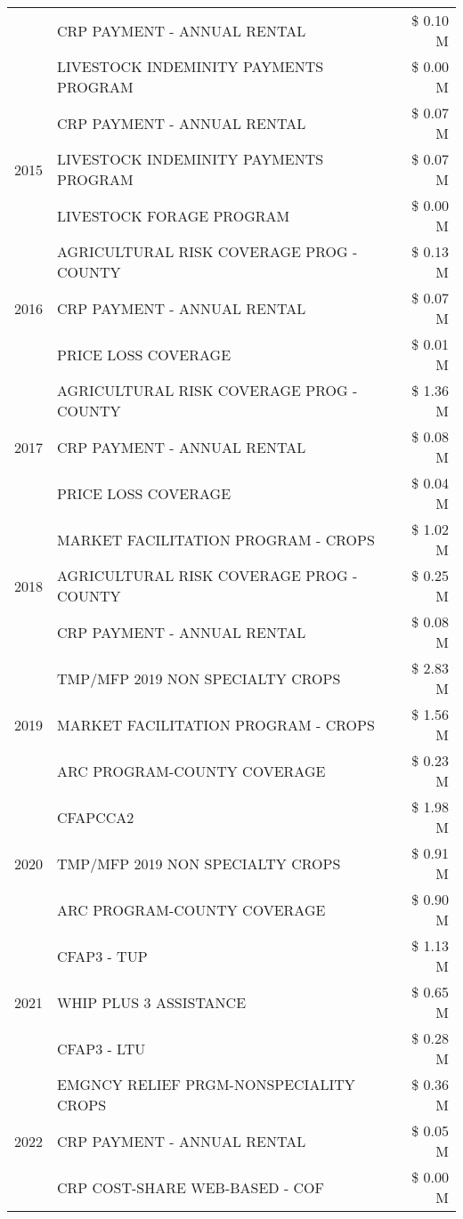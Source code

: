 \begin{tabular}{llr}
 & CRP PAYMENT - ANNUAL RENTAL & \$ 0.10 M \\
 & LIVESTOCK INDEMINITY PAYMENTS PROGRAM & \$ 0.00 M \\
\cline{1-3}
\multirow[t]{3}{*}{2015} & CRP PAYMENT - ANNUAL RENTAL & \$ 0.07 M \\
 & LIVESTOCK INDEMINITY PAYMENTS PROGRAM & \$ 0.07 M \\
 & LIVESTOCK FORAGE PROGRAM & \$ 0.00 M \\
\cline{1-3}
\multirow[t]{3}{*}{2016} & AGRICULTURAL RISK COVERAGE PROG - COUNTY & \$ 0.13 M \\
 & CRP PAYMENT - ANNUAL RENTAL & \$ 0.07 M \\
 & PRICE LOSS COVERAGE & \$ 0.01 M \\
\cline{1-3}
\multirow[t]{3}{*}{2017} & AGRICULTURAL RISK COVERAGE PROG - COUNTY & \$ 1.36 M \\
 & CRP PAYMENT - ANNUAL RENTAL & \$ 0.08 M \\
 & PRICE LOSS COVERAGE & \$ 0.04 M \\
\cline{1-3}
\multirow[t]{3}{*}{2018} & MARKET FACILITATION PROGRAM - CROPS & \$ 1.02 M \\
 & AGRICULTURAL RISK COVERAGE PROG - COUNTY & \$ 0.25 M \\
 & CRP PAYMENT - ANNUAL RENTAL & \$ 0.08 M \\
\cline{1-3}
\multirow[t]{3}{*}{2019} & TMP/MFP 2019 NON SPECIALTY CROPS & \$ 2.83 M \\
 & MARKET FACILITATION PROGRAM - CROPS & \$ 1.56 M \\
 & ARC PROGRAM-COUNTY COVERAGE & \$ 0.23 M \\
\cline{1-3}
\multirow[t]{3}{*}{2020} & CFAPCCA2 & \$ 1.98 M \\
 & TMP/MFP 2019 NON SPECIALTY CROPS & \$ 0.91 M \\
 & ARC PROGRAM-COUNTY COVERAGE & \$ 0.90 M \\
\cline{1-3}
\multirow[t]{3}{*}{2021} & CFAP3 - TUP & \$ 1.13 M \\
 & WHIP PLUS 3 ASSISTANCE & \$ 0.65 M \\
 & CFAP3 - LTU & \$ 0.28 M \\
\cline{1-3}
\multirow[t]{3}{*}{2022} & EMGNCY RELIEF PRGM-NONSPECIALITY CROPS & \$ 0.36 M \\
 & CRP PAYMENT - ANNUAL RENTAL & \$ 0.05 M \\
 & CRP COST-SHARE WEB-BASED - COF & \$ 0.00 M \\
\cline{1-3}
\bottomrule
\end{tabular}
